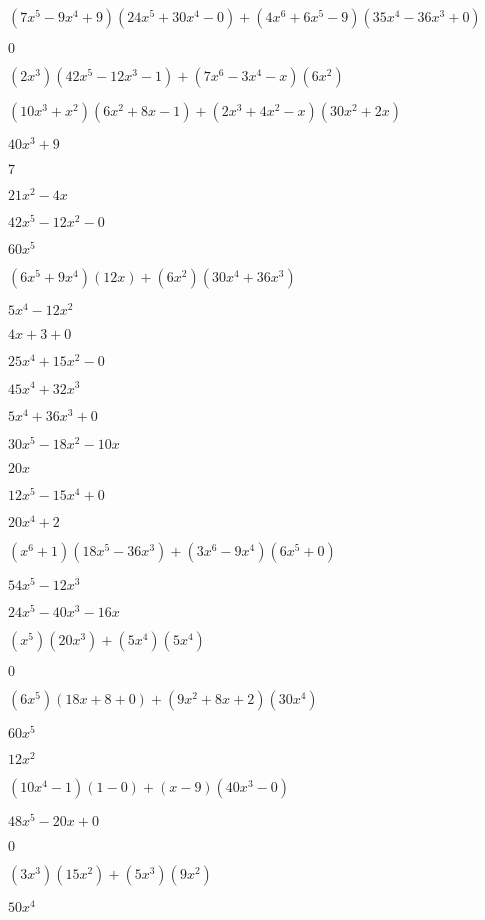 \documentclass{article}
\begin{document}
\begin{multicols}{2}
$(7x^{5}-9x^{4}+9)(24x^{5}+30x^{4}-0)+(4x^{6}+6x^{5}-9)(35x^{4}-36x^{3}+0)$\item $0$\item $(2x^{3})(42x^{5}-12x^{3}-1)+(7x^{6}-3x^{4}-x)(6x^{2})$\item $(10x^{3}+x^2)(6x^{2}+8x-1)+(2x^{3}+4x^2-x)(30x^{2}+2x)$\item $40x^{3}+9$\item $7$\item $21x^{2}-4x$\item $42x^{5}-12x^{2}-0$\item $60x^{5}$\item $(6x^{5}+9x^{4})(12x)+(6x^2)(30x^{4}+36x^{3})$\item $5x^{4}-12x^{2}$\item $4x+3+0$\item $25x^{4}+15x^{2}-0$\item $45x^{4}+32x^{3}$\item $5x^{4}+36x^{3}+0$\item $30x^{5}-18x^{2}-10x$\item $20x$\item $12x^{5}-15x^{4}+0$\item $20x^{4}+2$\item $(x^{6}+1)(18x^{5}-36x^{3})+(3x^{6}-9x^{4})(6x^{5}+0)$\item $54x^{5}-12x^{3}$\item $24x^{5}-40x^{3}-16x$\item $(x^{5})(20x^{3})+(5x^{4})(5x^{4})$\item $0$\item $(6x^{5})(18x+8+0)+(9x^2+8x+2)(30x^{4})$\item $60x^{5}$\item $12x^{2}$\item $(10x^{4}-1)(1-0)+(x-9)(40x^{3}-0)$\item $48x^{5}-20x+0$\item $0$\item $(3x^{3})(15x^{2})+(5x^{3})(9x^{2})$\item $50x^{4}$\item 
\end{multicols}
\end{document}
